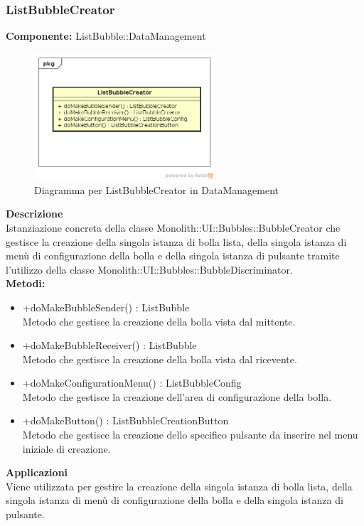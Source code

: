 \subsubsection{ListBubbleCreator}
\textbf{Componente:}  ListBubble::DataManagement\\
   \FloatBarrier
   \begin{figure}[ht]
   \centering
   \includegraphics[width=0.6\textwidth]{img/single-ListBubbleCreator}
   \caption{{Diagramma per ListBubbleCreator in DataManagement}}
\end{figure}
\FloatBarrier
\textbf{Descrizione}\\
Istanziazione concreta della classe Monolith::UI::Bubbles::BubbleCreator che gestisce la creazione della singola istanza di bolla lista, della singola istanza di menù di configurazione della bolla e della singola istanza di pulsante tramite l'utilizzo della classe Monolith::UI::Bubbles::BubbleDiscriminator.
\\
\textbf{Metodi:} 
\begin{itemize}
\item +doMakeBubbleSender() : ListBubble 
\\
Metodo che gestisce la creazione della bolla vista dal mittente.
\item +doMakeBubbleReceiver() : ListBubble 
\\
Metodo che gestisce la creazione della bolla vista dal ricevente.
\item +doMakeConfigurationMenu() : ListBubbleConfig 
\\
Metodo che gestisce la creazione dell'area di configurazione della bolla.
\item +doMakeButton() : ListBubbleCreationButton 
\\
Metodo che gestisce la creazione dello specifico pulsante da inserire nel menu iniziale di creazione.
\end{itemize} 


\textbf{Applicazioni}\\
Viene utilizzata per gestire la creazione della singola istanza di bolla lista, della singola istanza di menù di configurazione della bolla e della singola istanza di pulsante. 


